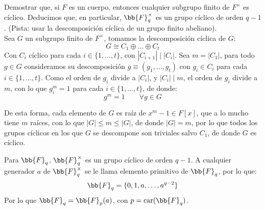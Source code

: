 \begin{ejercicio}\label{ej:subgrupo_finito}
    Demostrar que, si $F$ es un cuerpo, entonces cualquier subgrupo finito de $F^\times$ es cíclico. Deducimos que, en particular, $\bb{F}_q^\times$ es un grupo cíclico de orden $q-1$. (Pista: usar la descomposición cíclica de un grupo finito abeliano).\\

    \noindent
    Sea $G$ un subgrupo finito de $F^\times$, tomamos la descomposición cíclica de $G$:
    \begin{equation*}
        G \cong C_1 \oplus \ldots \oplus C_t
    \end{equation*}
    Con $C_i$ cíclico para cada $i \in \{1,\ldots,t\}$, con $|C_{i+1}|\mid |C_i|$. Sea $m = |C_1|$, para todo $g\in G$ consideramos su descomposición $g \equiv (g_1,\ldots,g_t)$ con $g_i\in C_i$ para cada $i \in \{1,\ldots,t\}$. Como el orden de $g_i$ divide a $|C_i|$, y $|C_i|\mid m$, el orden de $g_i$ divide a $m$, con lo que $g_i^m = 1$ para cada $i \in \{1,\ldots,t\}$, de donde:
    \begin{equation*}
        g^m = 1\qquad \forall g\in G
    \end{equation*}

    De esta forma, cada elemento de $G$ es raíz de $x^m-1\in F[x]$, que a lo mucho tiene $m$ raíces, con lo que $|G| \leq m\leq |G|$, de donde $|G| = m$, por lo que todos los grupos cíclicos en los que $G$ se descompone son triviales salvo $C_1$, de donde $G$ es cíclico.
\end{ejercicio}
\begin{observacion}
    Para $\bb{F}_q$, $\bb{F}_q^\times$ es un grupo cíclico de orden $q-1$.\newline
    A cualquier generador $a$ de $\bb{F}_q^\times$ se le llama elemento primitivo de $\bb{F}_q$, por lo que:
    \begin{equation*}
        \bb{F}_q = \{0, 1, a, \ldots, a^{q-2}\}
    \end{equation*}
    Por lo que $\bb{F}_q = \bb{F}_p(a)$, con $p = \car(\bb{F}_q)$.
\end{observacion}


